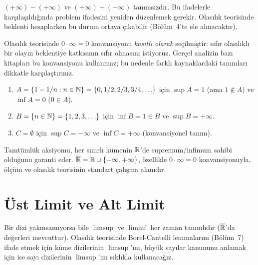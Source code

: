 \begin{uyari}
$(+\infty) - (+\infty)$ ve $(+\infty) + (-\infty)$ tanımsızdır.
Bu ifadelerle karşılaşıldığında problem ifadesini yeniden düzenlemek gerekir.
Olasılık teorisinde beklenti hesaplarken bu durum ortaya çıkabilir
(Bölüm~4'te ele alınacaktır).
\end{uyari}

\begin{hataanalizi}[$0 \cdot \infty = 0$ konvansiyonunun önemi]
Olasılık teorisinde $0 \cdot \infty = 0$ konvansiyonu \emph{kasıtlı olarak}
seçilmiştir: sıfır olasılıklı bir olayın beklentiye katkısının sıfır olmasını
istiyoruz. Gerçel analizin bazı kitapları bu konvansiyonu kullanmaz; bu nedenle
farklı kaynaklardaki tanımları dikkatle karşılaştırınız.
\end{hataanalizi}

\begin{ornek}
\begin{enumerate}[label=(\alph*)]
  \item $A = \{1 - 1/n : n \in \mathbb{N}\} = \{0, 1/2, 2/3, 3/4, \ldots\}$
        için $\sup A = 1$ (ama $1 \notin A$) ve $\inf A = 0$ ($0 \in A$).
  \item $B = \{n \in \mathbb{N}\} = \{1,2,3,\ldots\}$ için $\inf B = 1 \in B$ ve
        $\sup B = +\infty$.
  \item $C = \emptyset$ için $\sup C = -\infty$ ve $\inf C = +\infty$
        (konvansiyonel tanım).
\end{enumerate}
\end{ornek}

\begin{mikroozet}[§0.4 özeti]
Tamtümlük aksiyomu, her sınırlı kümenin $\mathbb{R}$'de supremum/infimum
sahibi olduğunu garanti eder.
$\overline{\mathbb{R}} = \mathbb{R} \cup \{-\infty, +\infty\}$,
özellikle $0 \cdot \infty = 0$ konvansiyonuyla, ölçüm ve olasılık teorisinin
standart çalışma alanıdır.
\end{mikroozet}


\section{Üst Limit ve Alt Limit}

\begin{motivasyon}[§0.5]
Bir dizi yakınsamıyorsa bile $\limsup$ ve $\liminf$ her zaman tanımlıdır
($\overline{\mathbb{R}}$'da değerleri mevcuttur). Olasılık teorisinde Borel-Cantelli
lemmalarını (Bölüm~7) ifade etmek için küme dizilerinin $\limsup$'ını,
büyük sayılar kanununu anlamak için ise sayı dizilerinin $\limsup$'ını
sıklıkla kullanacağız.
\end{motivasyon}

